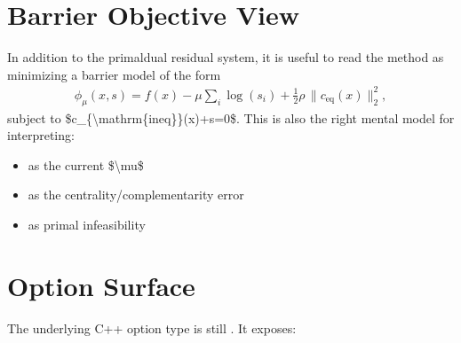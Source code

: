 \documentclass[letterpaper,10pt,english]{sphinxmanual}
\begin{document}
\section{Barrier Objective View}
\label{\detokenize{optima_internal_protocol:barrier-objective-view}}
\sphinxAtStartPar
In addition to the primal\sphinxhyphen{}dual residual system, it is useful to read the method as minimizing a barrier model of the form
\begin{equation*}
\begin{split}\phi_\mu(x,s) =
f(x)
- \mu \sum_i \log(s_i)
+ \tfrac12 \rho \, \|c_{\mathrm{eq}}(x)\|_2^2,\end{split}
\end{equation*}
\sphinxAtStartPar
subject to \$c\_\{\textbackslash{}mathrm\{ineq\}\}(x)+s=0\$. This is also the right mental model for interpreting:
\begin{itemize}
\item {} 
\sphinxAtStartPar
{} as the current \$\textbackslash{}mu\$

\item {} 
\sphinxAtStartPar
{} as the centrality/complementarity error

\item {} 
\sphinxAtStartPar
{} as primal infeasibility

\end{itemize}


\section{Option Surface}
\label{\detokenize{optima_internal_protocol:option-surface}}
\sphinxAtStartPar
The underlying C++ option type is still . It exposes:
\end{document}
